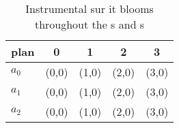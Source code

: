 \documentclass[a4paper]{article}
\begin{document}
\begin{table}
\begin{adjustbox}{width=0.5\columnwidth}
\begin{tabular}{|l|l|l|l|l|}
\hline
\textbf{plan} & \multicolumn{1}{c|}{\textbf{0}} & \multicolumn{1}{c|}{\textbf{1}} & \multicolumn{1}{c|}{\textbf{2}} & \multicolumn{1}{c|}{\textbf{3}} \\ \hline
\textbf{$a_0$}  & (0,0) & (1,0) & (2,0) & (3,0) \\ \hline
\textbf{$a_1$}  & (0,0) & (1,0) & (2,0) & (3,0) \\ \hline
\textbf{$a_2$}  & (0,0) & (1,0) & (2,0) & (3,0) \\ \hline
\end{tabular}
\end{adjustbox}
\caption{Instrumental sur it blooms throughout the s and s
}
\end{table}
\end{document}
